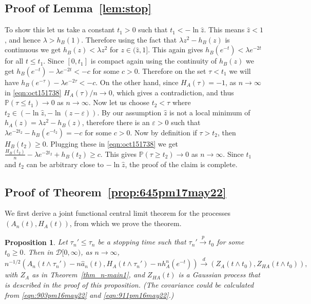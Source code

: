 \documentclass[11pt]{article}
\newtheorem{proposition}[theorem]{Proposition}
\newcommand{\vep}{\varepsilon}
\def\tod{\stackrel{d}{\longrightarrow}}
\def\top{\stackrel{p}{\longrightarrow}}
\newcommand{\cD}{\mathcal{D}}
\def\tod{\stackrel{d}{\longrightarrow}}
\def\top{\stackrel{p}{\longrightarrow}}
\begin{document}
\subsection{Proof of Lemma~\ref{lem:stop}}\label{sec:proofLem}
To show this let us take a constant $t_1>0$ such that $t_1 < -\ln \widehat{z}$. This means $\widehat{z}<1$, and hence $\lambda  > h_B(1)$. Therefore using the fact that $\lambda  z^2 - h_B(z)$ is continuous we get $h_B(z) < \lambda z^2$ for $z \in (\widehat{z},1]$. This again gives $h_B(e^{-t}) < \lambda e^{-2t}$ for all $t \leq t_1$. Since $[0,t_1]$ is compact again using the continuity of $h_B(z)$ we get $h_B(e^{-t}) - \lambda e^{-2t}<-c$ for some $c>0$. Therefore on the set $\tau< t_1$ we will have $h_B(e^{-\tau}) - \lambda e^{-2\tau}<-c$.  On the other hand, since $H_A(\tau) =-1$, as $n\rightarrow \infty$ in \eqref{eqn:oct151738} ${H_A(\tau)}/{n} \rightarrow 0$, which gives a contradiction, and thus
$\mathbb{P}(\tau \leq t_1) \rightarrow 0$ as $n \rightarrow \infty$. Now let us choose $t_2 < \tau$ where $t_2 \in ( -\ln{\widehat{z}}, -\ln{(\widehat{z} -\vep)})$. By our assumption $\widehat{z}$ is not a local minimum of $h_A(z)=\lambda  z^2 - h_B(z)$, therefore there is an $\vep>0$ such that $\lambda  e^{-2t_2} - h_B(e^{-t_2})=-c$ for some $c>0$. Now by definition if $\tau>t_2$, then $H_B(t_2)\geq 0$. Plugging these in \eqref{eqn:oct151738} we get $\frac{H_B(t_2)}{n} - \lambda e^{-2t_2} + h_B(t_2) \geq c$. This gives $\mathbb{P}(\tau \geq t_2) \rightarrow 0$ as $n \rightarrow \infty$. Since $t_1$ and $t_2$ can be arbitrary close to $-\ln \widehat{z}$, the proof of the claim is complete.

\subsection{Proof of Theorem~\ref{prop:645pm17may22}}\label{proof:prop:645pm17may22}
We first derive a joint functional central limit theorem for the processes $(A_n(t),H_A(t))$, from which we prove the theorem.

\begin{proposition}
\label{prop:446pm17may22}
Let $\tau_n' \leq \tau_n$ be a stopping time such that $\tau_n' \top t_0$ for some $t_0 \geq 0$. Then in $\cD[0,\infty)$,  as $n\to \infty$,
\begin{equation}
\label{eqn:444pm17may}
  n^{-1/2}  \left(A_n(t\wedge \tau_n')- n\widehat{a}_n(t),H_A(t\wedge \tau_n')- n h_A^n(e^{-
  t})\right) \tod (Z_A(t\wedge t_0), Z_{HA}(t\wedge t_0) ), 
\end{equation}
with $Z_A$ as in Theorem~\ref{thm_n-main1}, and $Z_{HA}(t)$ is a Gaussian process that is described in the proof of this proposition. (The covariance could be calculated from \eqref{eqn:903pm16may22} and \eqref{eqn:911pm16may22}.)
\end{proposition}
\end{document}
